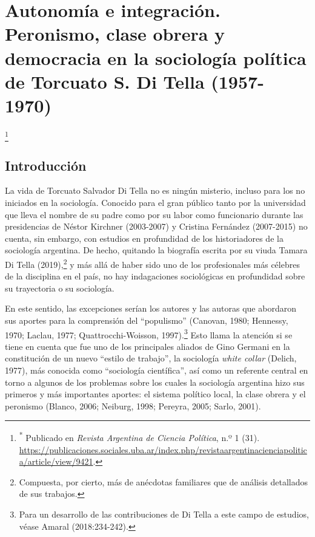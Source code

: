 \chapter{Autonomía e integración. Peronismo, clase obrera y democracia en la sociología política de Torcuato S. Di Tella (1957-1970)}

\footnote{\textsuperscript{*} Publicado en \emph{Revista Argentina de Ciencia Política}, n.º 1 (31). \url{https://publicaciones.sociales.uba.ar/index.php/revistaargentinacienciapolitica/article/view/9421}.}

\section{Introducción}

La vida de Torcuato Salvador Di Tella no es ningún misterio, incluso para los no iniciados en la sociología. Conocido para el gran público tanto por la universidad que lleva el nombre de su padre como por su labor como funcionario durante las presidencias de Néstor Kirchner (2003-2007) y Cristina Fernández (2007-2015) no cuenta, sin embargo, con estudios en profundidad de los historiadores de la sociología argentina. De hecho, quitando la biografía escrita por su viuda Tamara Di Tella (2019),\footnote{Compuesta, por cierto, más de anécdotas familiares que de análisis detallados de sus trabajos.} y más allá de haber sido uno de los profesionales más célebres de la disciplina en el país, no hay indagaciones sociológicas en profundidad sobre su trayectoria o su sociología.

En este sentido, las excepciones serían los autores y las autoras que abordaron sus aportes para la comprensión del ``populismo'' (Canovan, 1980; Hennessy, 1970; Laclau, 1977; Quattrocchi-Woisson, 1997).\footnote{Para un desarrollo de las contribuciones de Di Tella a este campo de estudios, véase Amaral (2018:234-242).} Esto llama la atención si se tiene en cuenta que fue uno de los principales aliados de Gino Germani en la constitución de un nuevo ``estilo de trabajo'', la sociología \emph{white collar} (Delich, 1977), más conocida como ``sociología científica'', así como un referente central en torno a algunos de los problemas sobre los cuales la sociología argentina hizo sus primeros y más importantes aportes: el sistema político local, la clase obrera y el peronismo (Blanco, 2006; Neiburg, 1998; Pereyra, 2005; Sarlo, 2001).

